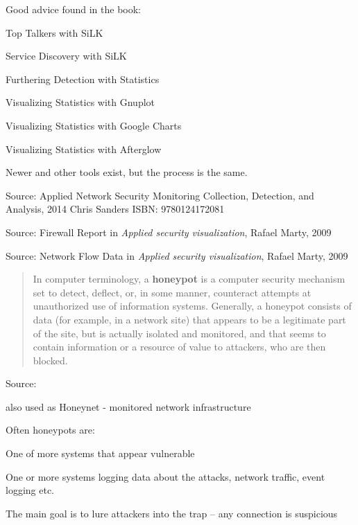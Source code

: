 \documentclass[Screen16to9,17pt]{foils}
\begin{document}

Good advice found in the book:
\begin{list2}
\item Top Talkers with SiLK
\item Service Discovery with SiLK
\item Furthering Detection with Statistics
\item Visualizing Statistics with Gnuplot
\item Visualizing Statistics with Google Charts
\item Visualizing Statistics with Afterglow
\end{list2}

Newer and other tools exist, but the process is the same.

Source: Applied Network Security Monitoring Collection, Detection, and Analysis, 2014 Chris Sanders ISBN: 9780124172081





Source: Firewall Report in \emph{Applied security visualization}, Rafael Marty, 2009




Source: Network Flow Data in \emph{Applied security visualization}, Rafael Marty, 2009




\vskip 1cm
\begin{quote}
In computer terminology, a {\bf honeypot} is a computer security mechanism set to detect, deflect, or, in some manner, counteract attempts at unauthorized use of information systems. Generally, a honeypot consists of data (for example, in a network site) that appears to be a legitimate part of the site, but is actually isolated and monitored, and that seems to contain information or a resource of value to attackers, who are then blocked.
\end{quote}

Source:

also used as Honeynet - monitored network infrastructure

\begin{list1}
\item Often honeypots are:
\begin{list2}
\item One of more systems that appear vulnerable
\item One or more systems logging data about the attacks, network traffic, event logging etc.
\end{list2}
\item The main goal is to lure attackers into the trap -- any connection is suspicious
\end{list1}
\end{document}
